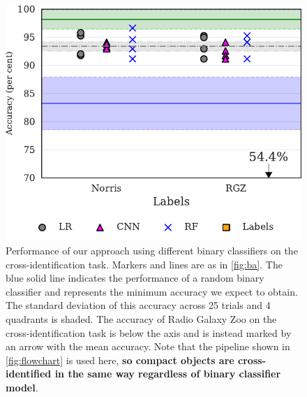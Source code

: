 \documentclass[fleqn,usenatbib,usedcolumn]{mnras}
\newcommand{\edited}[1]{{\bf {#1}}}
\begin{document}
    \begin{figure}
      \centering
      \includegraphics[]{images/cdfs_cross_identification_grid.pdf}
      \caption{Performance of our approach using different binary classifiers on the cross-identification task. Markers and lines are as in \autoref{fig:ba}. The blue solid line indicates the performance of a random binary classifier and represents the minimum accuracy we expect to obtain. The standard deviation of this accuracy across 25 trials and 4 quadrants is shaded. The accuracy of Radio Galaxy Zoo on the cross-identification task is below the axis and is instead marked by an arrow with the mean accuracy. Note that the pipeline shown in \autoref{fig:flowchart} is used here, \edited{so compact objects are cross-identified in the same way regardless of binary classifier model}. \label{fig:cross-id-accuracy}}
    \end{figure}
\end{document}
